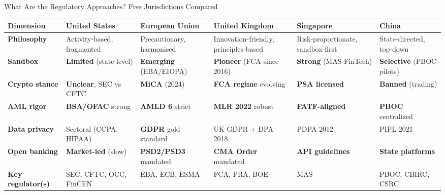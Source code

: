 \documentclass[aspectratio=169, 11pt]{beamer}
\begin{document}
\begin{frame}{What Are the Regulatory Approaches? Five Jurisdictions Compared}

\vspace{0.1em}
\begin{center}
\scriptsize
\begin{tabular}{@{}p{2.0cm}p{2.2cm}p{2.2cm}p{2.2cm}p{2.2cm}p{2.2cm}@{}}
\toprule
\textbf{Dimension} & \textbf{United States} & \textbf{European Union} & \textbf{United Kingdom} & \textbf{Singapore} & \textbf{China} \\
\midrule
\textbf{Philosophy} & Activity-based, fragmented & Precautionary, harmonised & Innovation-friendly, principles-based & Risk-proportionate, sandbox-first & State-directed, top-down \\[3pt]
\textbf{Sandbox} & \textcolor{mlred}{\textbf{Limited}} (state-level) & \textcolor{mlorange}{\textbf{Emerging}} (EBA/EIOPA) & \textcolor{mlgreen}{\textbf{Pioneer}} (FCA since 2016) & \textcolor{mlgreen}{\textbf{Strong}} (MAS FinTech) & \textcolor{mlorange}{\textbf{Selective}} (PBOC pilots) \\[3pt]
\textbf{Crypto stance} & \textcolor{mlorange}{\textbf{Unclear}}, SEC vs CFTC & \textcolor{mlgreen}{\textbf{MiCA}} (2024) & \textcolor{mlgreen}{\textbf{FCA regime}} evolving & \textcolor{mlgreen}{\textbf{PSA licensed}} & \textcolor{mlred}{\textbf{Banned}} (trading) \\[3pt]
\textbf{AML rigor} & \textcolor{mlgreen}{\textbf{BSA/OFAC}} strong & \textcolor{mlgreen}{\textbf{AMLD 6}} strict & \textcolor{mlgreen}{\textbf{MLR 2022}} robust & \textcolor{mlgreen}{\textbf{FATF-aligned}} & \textcolor{mlgreen}{\textbf{PBOC}} centralized \\[3pt]
\textbf{Data privacy} & Sectoral (CCPA, HIPAA) & \textcolor{mlgreen}{\textbf{GDPR}} gold standard & UK GDPR + DPA 2018 & PDPA 2012 & PIPL 2021 \\[3pt]
\textbf{Open banking} & \textcolor{mlred}{\textbf{Market-led}} (slow) & \textcolor{mlgreen}{\textbf{PSD2/PSD3}} mandated & \textcolor{mlgreen}{\textbf{CMA Order}} mandated & \textcolor{mlorange}{\textbf{API guidelines}} & \textcolor{mlred}{\textbf{State platforms}} \\[3pt]
\textbf{Key regulator(s)} & SEC, CFTC, OCC, FinCEN & EBA, ECB, ESMA & FCA, PRA, BOE & MAS & PBOC, CBIRC, CSRC \\
\bottomrule
\end{tabular}
\end{center}


\end{frame}
\end{document}
